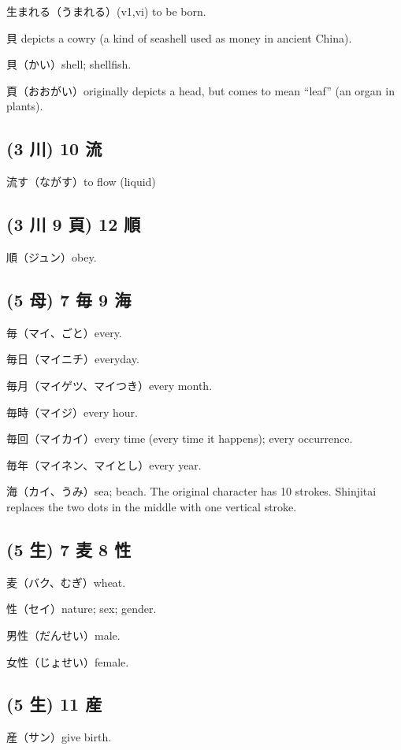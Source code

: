 生まれる（うまれる）(v1,vi) to be born.

貝 depicts a cowry (a kind of seashell used as money in ancient China).

貝（かい）shell; shellfish.

頁（おおがい）originally depicts a head,
but comes to mean ``leaf'' (an organ in plants).

\subsection{(3 川) 10 流}

流す（ながす）to flow (liquid)

\subsection{(3 川 9 頁) 12 順}

順（ジュン）obey.

\subsection{(5 母) 7 毎 9 海}

毎（マイ、ごと）every.

毎日（マイニチ）everyday.

毎月（マイゲツ、マイつき）every month.

毎時（マイジ）every hour.

毎回（マイカイ）every time (every time it happens); every occurrence.

毎年（マイネン、マイとし）every year.

海（カイ、うみ）sea; beach.
The original character has 10 strokes.
Shinjitai replaces the two dots in the middle
with one vertical stroke.

\subsection{(5 生) 7 麦 8 性}

麦（バク、むぎ）wheat.

性（セイ）nature; sex; gender.

男性（だんせい）male.

女性（じょせい）female.

\subsection{(5 生) 11 産}

産（サン）give birth.

